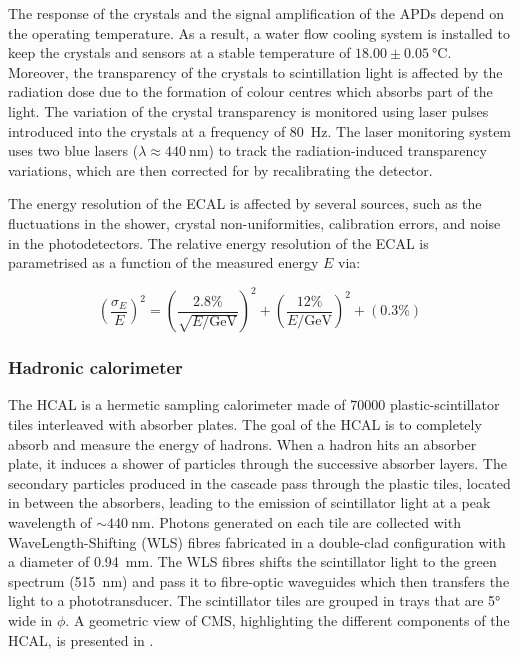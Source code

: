 The response of the crystals and the signal amplification of the APDs depend on the operating temperature. As a result, a water flow cooling system is installed to keep the crystals and sensors at a stable  temperature of $18.00\pm\SI{0.05}{\celsius}$. Moreover, the transparency of the crystals to scintillation light is affected by the radiation dose due to the formation of colour centres which absorbs part of the light. The variation of the crystal transparency is monitored using laser pulses introduced into the crystals at a frequency of \SI{80}{\Hz}. The laser monitoring system uses two blue lasers ($\lambda\approx\SI{440}{\nm}$) to track the radiation-induced transparency variations, which are then corrected for by recalibrating the detector.

The energy resolution of the ECAL is affected by several sources, such as the fluctuations in the shower, crystal non-uniformities, calibration errors, and noise in the photodetectors. The relative energy resolution of the ECAL is parametrised as a function of the measured energy $E$ via:

\begin{equation}
  \left(\frac{\sigma_{E}}{E}\right)^{2} = \left(\frac{2.8\%}{\sqrt{E/\si{\GeV}}}\right)^{2} + \left(\frac{12\%}{E/\si{\GeV}}\right)^{2} + \left(0.3\%\right)
\end{equation}


\subsubsection{Hadronic calorimeter}\label{sec:Experiment_CMS_Subdetectors_HCAL}

The HCAL is a hermetic sampling calorimeter made of 70000 plastic-scintillator tiles interleaved with absorber plates. The goal of the HCAL is to completely absorb and measure the energy of hadrons. When a hadron hits an absorber plate, it induces a shower of particles through the successive absorber layers. The secondary particles produced in the cascade pass through the plastic tiles, located in between the absorbers, leading to the emission of scintillator light at a peak wavelength of $\sim\SI{440}{\nm}$. Photons generated on each tile are collected with WaveLength-Shifting (WLS) fibres fabricated in a double-clad configuration with a diameter of \SI{0.94}{\mm}. The WLS fibres shifts the scintillator light to the green spectrum (\SI{515}{\nm}) and pass it to fibre-optic waveguides which then transfers the light to a phototransducer. The scintillator tiles are grouped in trays that are \ang{5} wide in $\phi$. A geometric view of CMS, highlighting the different components of the HCAL, is presented in .

